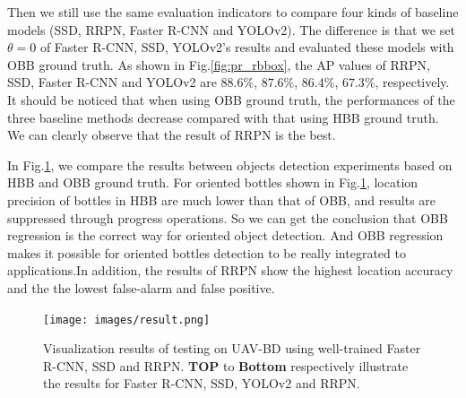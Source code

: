 Then we still use the same evaluation indicators to compare four kinds of baseline models (SSD, RRPN, Faster R-CNN and YOLOv2). The difference is that we set $ \theta = 0 $ of Faster R-CNN, SSD, YOLOv2's results and evaluated these models with OBB ground truth. As shown in Fig.\ref{fig:pr_rbbox}, the AP values of RRPN, SSD, Faster R-CNN and YOLOv2 are $ 88.6\% $, $ 87.6\% $, $ 86.4\% $, $ 67.3\% $, respectively. It should be noticed that when using OBB ground truth, the performances of the three baseline methods decrease compared with that using HBB ground truth. We can clearly observe that the result of RRPN is the best.

In Fig.\ref{fig:result}, we compare the results between objects detection experiments based on HBB and OBB ground truth. For oriented bottles shown in Fig.\ref{fig:result}, location precision of bottles in HBB are much lower than that of OBB, and results are suppressed through progress operations. So we can get the conclusion that OBB regression is the correct way for oriented object detection. And OBB regression makes it possible for oriented bottles detection to be really integrated to applications.In addition, the results of RRPN show the highest location accuracy and the the lowest false-alarm and false positive.


\begin{figure}
	\texttt{[image: images/result.png]}
	\caption{Visualization results of testing on UAV-BD using well-trained Faster R-CNN, SSD and RRPN. \textbf{TOP} to \textbf{Bottom} respectively illustrate the results for Faster R-CNN, SSD, YOLOv2 and RRPN.}
	\label{fig:result}
\end{figure}







